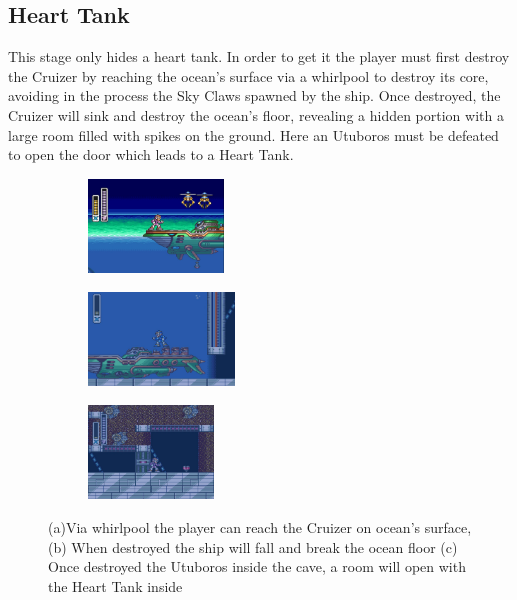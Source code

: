 \subsection{Heart Tank}
This stage only hides a heart tank. In order to get it the player must first destroy the Cruizer by reaching the ocean's surface via a whirlpool to destroy its core, avoiding in the process the Sky Claws spawned by the ship. Once destroyed, the Cruizer will sink and  destroy the ocean's floor, revealing a hidden portion with a large room filled with spikes on the ground. Here an Utuboros  must be defeated to open the door which leads to a Heart Tank. 
\begin{figure}[htp]
	\centering
	\begin{subfigure}{0.32\textwidth}
		\centering
		\includegraphics[height=2.5cm]{figures/X1/Launch_octopus/Octopus_heart_1.jpg}
		\caption{}
	\end{subfigure}
	\begin{subfigure}{0.32\textwidth}
		\centering
		\includegraphics[height=2.5cm]{figures/X1/Launch_octopus/Octopus_heart_2.jpg}
		\caption{}
	\end{subfigure}
	\begin{subfigure}{0.32\textwidth}
		\centering
		\includegraphics[height=2.5cm]{figures/X1/Launch_octopus/Octopus_heart_3.jpg}
		\caption{}
	\end{subfigure}
	\caption{(a)Via whirlpool the player can reach the Cruizer on ocean's surface,(b) When destroyed the ship will fall and break the ocean floor (c) Once destroyed the Utuboros inside the cave, a room will open with the Heart Tank inside}
\end{figure}

